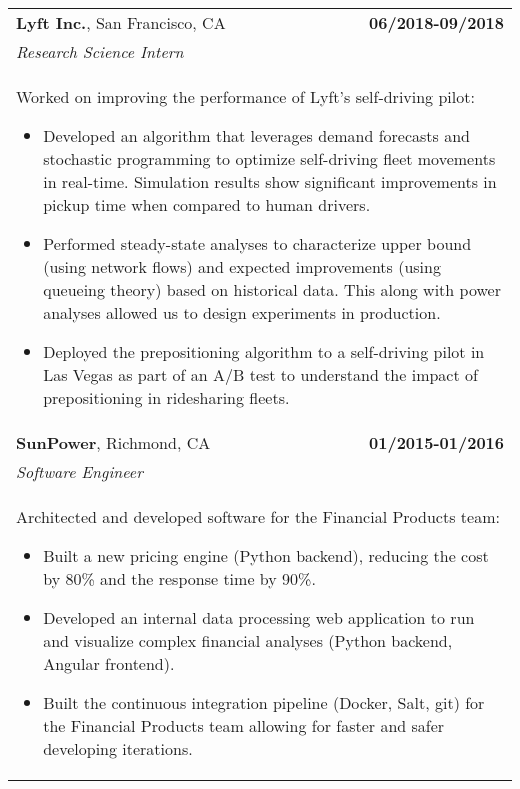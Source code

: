 \documentclass[a4paper,10pt]{article}
\begin{document}
\begin{tabularx}{\textwidth}{Xr}
 {\bf{Lyft Inc.}}, San Francisco, CA & \bf{06/2018-09/2018}\\
 \emph{Research Science Intern} &\\
 \multicolumn{2}{p{0.98\textwidth}}{
 Worked on improving the performance of Lyft's self-driving pilot:
 \begin{itemize}
 	\item Developed an algorithm that leverages demand forecasts and stochastic programming to optimize self-driving fleet movements in real-time. Simulation results show significant improvements in pickup time when compared to human drivers.
 	\item Performed steady-state analyses to characterize upper bound (using network flows) and expected improvements (using queueing theory) based on historical data. This along with power analyses allowed us to design experiments in production.
 	\item Deployed the prepositioning algorithm to a self-driving pilot in Las Vegas as part of an A/B test to understand the impact of prepositioning in ridesharing fleets.%
 \end{itemize}
 }\\

{\bf{SunPower}}, Richmond, CA & \bf{01/2015-01/2016}\\
\emph{Software Engineer} &\\
\multicolumn{2}{p{0.98\textwidth}}{
Architected and developed software for the Financial Products team:
\begin{itemize}
	\item Built a new pricing engine (Python backend), reducing the cost by 80\% and the response time by 90\%.
	\item Developed an internal data processing web application to run and visualize complex financial analyses (Python backend, Angular frontend).
	\item Built the continuous integration pipeline (Docker, Salt, git) for the Financial Products team allowing for faster and safer developing iterations.
\end{itemize}
}\\


\end{tabularx}
\end{document}
